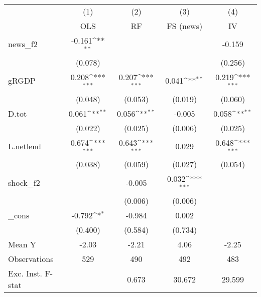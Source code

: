 {
\def\sym#1{\ifmmode^{#1}\else\(^{#1}\)\fi}
\begin{tabular}{l*{4}{c}}
\toprule
            &\multicolumn{1}{c}{(1)}&\multicolumn{1}{c}{(2)}&\multicolumn{1}{c}{(3)}&\multicolumn{1}{c}{(4)}\\
            &\multicolumn{1}{c}{OLS}&\multicolumn{1}{c}{RF}&\multicolumn{1}{c}{FS (news)}&\multicolumn{1}{c}{IV}\\
\midrule
news\_f2     &      -0.161\sym{**} &                     &                     &      -0.159         \\
            &     (0.078)         &                     &                     &     (0.256)         \\
\addlinespace
gRGDP       &       0.208\sym{***}&       0.207\sym{***}&       0.041\sym{**} &       0.219\sym{***}\\
            &     (0.048)         &     (0.053)         &     (0.019)         &     (0.060)         \\
\addlinespace
D.tot       &       0.061\sym{**} &       0.056\sym{**} &      -0.005         &       0.058\sym{**} \\
            &     (0.022)         &     (0.025)         &     (0.006)         &     (0.025)         \\
\addlinespace
L.netlend   &       0.674\sym{***}&       0.643\sym{***}&       0.029         &       0.648\sym{***}\\
            &     (0.038)         &     (0.059)         &     (0.027)         &     (0.054)         \\
\addlinespace
shock\_f2    &                     &      -0.005         &       0.032\sym{***}&                     \\
            &                     &     (0.006)         &     (0.006)         &                     \\
\addlinespace
\_cons      &      -0.792\sym{*}  &      -0.984         &       0.002         &                     \\
            &     (0.400)         &     (0.584)         &     (0.734)         &                     \\
\midrule
Mean Y      &       -2.03         &       -2.21         &        4.06         &       -2.25         \\
Observations&         529         &         490         &         492         &         483         \\
Exc. Inst. F-stat&                     &       0.673         &      30.672         &      29.599         \\
\bottomrule
\end{tabular}
}
